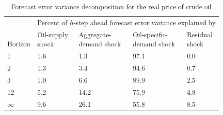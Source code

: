 \begin{table}

\caption{\label{tab:fevd-rpoil} Forecast error variance decomposition for the real price of crude oil}
\centering
\begin{tabular}[t]{lllll}
\toprule
\multicolumn{1}{c}{ } & \multicolumn{4}{c}{Percent of $h$-step ahead forecast error variance explained by} \\
\cmidrule(l{3pt}r{3pt}){2-5}
\makecell[l]{\\Horizon} & \makecell[l]{Oil-supply\\shock} & \makecell[l]{Aggregate-\\demand shock} & \makecell[l]{Oil-specific-\\demand shock} & \makecell[l]{Residual\\shock}\\
\midrule
1 & 1.6 & 1.3 & 97.1 & 0.0\\
2 & 1.3 & 3.4 & 94.6 & 0.7\\
3 & 1.0 & 6.6 & 89.9 & 2.5\\
12 & 5.2 & 14.2 & 75.9 & 4.8\\
$\infty$ & 9.6 & 26.1 & 55.8 & 8.5\\
\bottomrule
\end{tabular}
\end{table}
